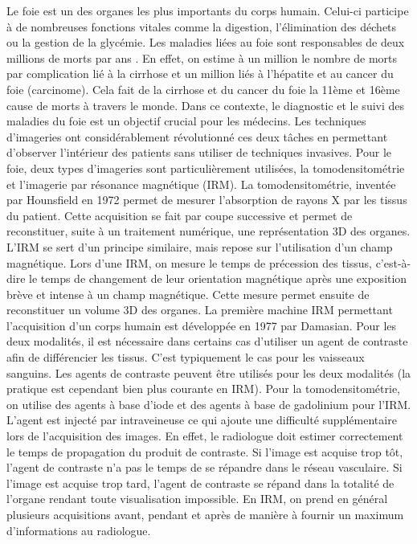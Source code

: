 Le foie est un des organes les plus importants du corps humain. Celui-ci participe à de nombreuses fonctions vitales comme la digestion, l'élimination des déchets ou la gestion de la glycémie. Les maladies liées au foie sont responsables de deux millions de morts par ans \cite{Asrani2019_liver_deseases}. En effet, on estime à un million le nombre de morts par complication lié à la cirrhose et un million liés à l'hépatite et au cancer du foie (carcinome). Cela fait de la cirrhose et du cancer du foie la 11ème et 16ème cause de morts à travers le monde.
Dans ce contexte, le diagnostic et le suivi des maladies du foie est un objectif crucial pour les médecins. Les techniques d'imageries ont considérablement révolutionné ces deux tâches en permettant d'observer l'intérieur des patients sans utiliser de techniques invasives. Pour le foie, deux types d'imageries sont particulièrement utilisées, la tomodensitométrie et l'imagerie par résonance magnétique (IRM). La tomodensitométrie, inventée par Hounsfield en 1972 permet de mesurer l'absorption de rayons X par les tissus du patient. Cette acquisition se fait par coupe successive et permet de reconstituer, suite à un traitement numérique, une représentation 3D des organes. L'IRM se sert d'un principe similaire, mais repose sur l'utilisation d'un champ magnétique. Lors d'une IRM, on mesure le temps de précession des tissus, c'est-à-dire le temps de changement de leur orientation magnétique après une exposition brève et intense à un champ magnétique. Cette mesure permet ensuite de reconstituer un volume 3D des organes. La première machine IRM permettant l'acquisition d'un corps humain est développée en 1977 par Damasian. Pour les deux modalités, il est nécessaire dans certains cas d'utiliser un agent de contraste afin de différencier les tissus. C'est typiquement le cas pour les vaisseaux sanguins. 
Les agents de contraste peuvent être utilisés pour les deux modalités (la pratique est cependant bien plus courante en IRM). Pour la tomodensitométrie, on utilise des agents à base d'iode et des agents à base de gadolinium pour l'IRM. L'agent est injecté par intraveineuse ce qui ajoute une difficulté supplémentaire lors de l'acquisition des images. En effet, le radiologue doit estimer correctement le temps de propagation du produit de contraste. Si l'image est acquise trop tôt, l'agent de contraste n'a pas le temps de se répandre dans le réseau vasculaire. Si l'image est acquise trop tard, l'agent de contraste se répand dans la totalité de l'organe rendant toute visualisation impossible. En IRM, on prend en général plusieurs acquisitions avant, pendant et après de manière à fournir un maximum d'informations au radiologue.

